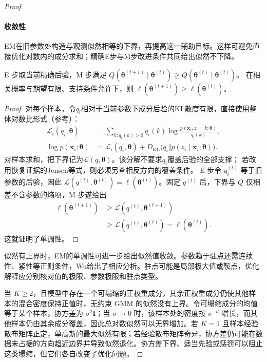 \begin{proof}
\paragraph{收敛性}
EM在旧参数处构造与观测似然相等的下界，再提高这一辅助目标。这样可避免直接优化对数内的成分求和；精确E步与M步改进条件共同给出似然不下降。

\begin{theorem}[EM 的似然单调性]
 \label{thm:clustering-em}
 E 步取当前精确后验，M 步满足
 $Q(\bm{\theta}^{(t+1)}\mid\bm{\theta}^{(t)})
 \geq Q(\bm{\theta}^{(t)}\mid\bm{\theta}^{(t)})$。
 在相关概率与期望有限、支持条件允许下，则
 $\ell(\bm{\theta}^{(t+1)})\geq\ell(\bm{\theta}^{(t)})$。
\end{theorem}
\begin{proof}
对每个样本，令$q_i$相对于当前参数下成分后验的KL散度有限，直接使用整体对数比形式（参考）：
\[
 \begin{aligned}
 \mathcal L_i(q_i,\bm\theta)
 &=\sum_{k:q_i(k)>0}q_i(k)
    \log\frac{p(\bm x_i,z_i=k;\bm\theta)}{q_i(k)},\\
 \log p(\bm x_i;\bm\theta)
 &=\mathcal L_i(q_i,\bm\theta)
   +D_{\mathrm{KL}}\bigl(q_i\Vert p(z_i\mid\bm x_i;\bm\theta)\bigr).
 \end{aligned}
\]
对样本求和，把下界记为$\mathcal L(q,\bm\theta)$。该分解不要求$q_i$覆盖后验的全部支撑；
若改用恢复证据的Jensen等式，则必须另查相反方向的覆盖条件。
E 步令 $q_i^{(t)}$ 等于旧参数的后验，因此 $\mathcal{L}(q^{(t)},\bm{\theta}^{(t)})=\ell(\bm{\theta}^{(t)})$。固定 $q^{(t)}$ 后，下界与 $Q$ 仅相差不含参数的熵项，M 步遂给出
\[
 \begin{aligned}
 \ell(\bm{\theta}^{(t+1)})
 &\geq\mathcal{L}(q^{(t)},\bm{\theta}^{(t+1)})\\
 &\geq\mathcal{L}(q^{(t)},\bm{\theta}^{(t)})
 =\ell(\bm{\theta}^{(t)}).
 \end{aligned}
\]
这就证明了单调性。
\end{proof}

似然有上界时，EM的单调性可进一步给出似然值收敛。参数趋于驻点还需连续性、紧性等正则条件，Wu给出了相应分析。驻点可能是局部极大值或鞍点，优化解释应分别核对值的极限、参数极限和驻点类型。

当 $K\geq2$，且模型中存在一个可塌缩的正权重成分，其余正权重成分仍使其他样本的混合密度保持正值时，无约束 GMM 的似然没有上界。令可塌缩成分的均值等于某个样本，协方差为 $\sigma^2\bm{I}$；当 $\sigma\to0$ 时，该样本处的密度按 $\sigma^{-d}$ 增长，而其他样本仍由其余成分覆盖，因此总对数似然可以无界增加。若 $K=1$ 且样本经验散布矩阵正定，单高斯的最大似然有限；若经验散布矩阵奇异，协方差仍可能在数据未占据的方向趋近边界并导致似然退化。协方差下界、适当先验或惩罚可以阻止这类塌缩，但它们各自改变了优化问题。


\end{proof}
